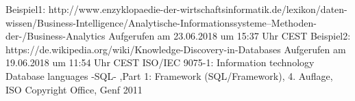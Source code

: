 \documentclass[12pt,twocolumn,twoside]{conference}   %
\begin{document}
\begin{thebibliography}{99}
	Beispiel1: http://www.enzyklopaedie-der-wirtschaftsinformatik.de/lexikon/daten-wissen/Business-Intelligence/Analytische-Informationssysteme--Methoden-der-/Business-Analytics 
	Aufgerufen am 23.06.2018 um 15:37 Uhr CEST
	Beispiel2: https://de.wikipedia.org/wiki/Knowledge-Discovery-in-Databases
	Aufgerufen am 19.06.2018 um 11:54 Uhr CEST
	ISO/IEC 9075-1: Information technology
	Database languages -SQL- ,Part 1: Framework
	(SQL/Framework), 4. Auflage, ISO Copyright Office,
	Genf 2011
\end{thebibliography}
\end{document}
